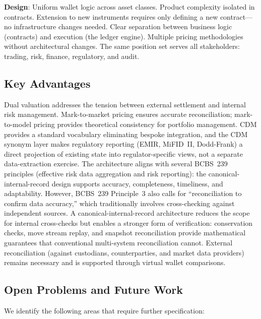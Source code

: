 \documentclass[11pt,a4paper]{article}
\begin{document}
\noindent\textbf{Design}: Uniform wallet logic across asset classes. Product complexity isolated in contracts. Extension to new instruments requires only defining a new contract---no infrastructure changes needed. Clear separation between business logic (contracts) and execution (the ledger engine). Multiple pricing methodologies without architectural changes. The same position set serves all stakeholders: trading, risk, finance, regulatory, and audit.

\subsection{Key Advantages}

Dual valuation addresses the tension between external settlement and internal risk management. Mark-to-market pricing ensures accurate reconciliation; mark-to-model pricing provides theoretical consistency for portfolio management. CDM provides a standard vocabulary eliminating bespoke integration, and the CDM synonym layer makes regulatory reporting (EMIR, MiFID~II, Dodd-Frank) a direct projection of existing state into regulator-specific views, not a separate data-extraction exercise. The architecture aligns with several BCBS~239 principles (effective risk data aggregation and risk reporting): the canonical-internal-record design supports accuracy, completeness, timeliness, and adaptability. However, BCBS~239 Principle~3 also calls for ``reconciliation to confirm data accuracy,'' which traditionally involves cross-checking against independent sources. A canonical-internal-record architecture reduces the scope for internal cross-checks but enables a stronger form of verification: conservation checks, move stream replay, and snapshot reconciliation provide mathematical guarantees that conventional multi-system reconciliation cannot. External reconciliation (against custodians, counterparties, and market data providers) remains necessary and is supported through virtual wallet comparisons.

\subsection{Open Problems and Future Work}

We identify the following areas that require further specification:
\end{document}
